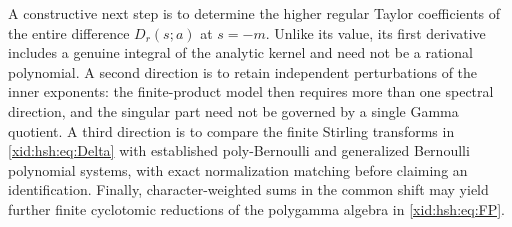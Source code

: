 A constructive next step is to determine the higher regular Taylor
coefficients of the entire difference $D_r(s;a)$ at $s=-m$. Unlike its
value, its first derivative includes a genuine integral of the analytic
kernel and need not be a rational polynomial. A second direction is to
retain independent perturbations of the inner exponents: the finite-product
model then requires more than one spectral direction, and the singular
part need not be governed by a single Gamma quotient. A third direction is to compare the finite
Stirling transforms in \eqref{xid:hsh:eq:Delta} with established
poly-Bernoulli and generalized Bernoulli polynomial systems, with exact
normalization matching before claiming an identification. Finally,
character-weighted sums in the common shift may yield further finite
cyclotomic reductions of the polygamma algebra in \eqref{xid:hsh:eq:FP}.

